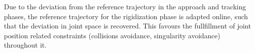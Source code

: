 Due to the deviation from the reference trajectory in the approach and tracking phases, the reference trajectory for the rigidization phase is adapted online, such that the deviation in joint space is recovered. This favours the fullfillment of joint position related constraints (collisions avoidance, singularity avoidance) throughout it. 
%
%
%
%
%
